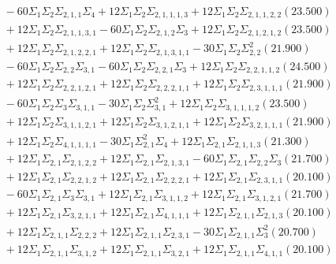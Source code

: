 \documentclass[12pt]{article}
\begin{document}
\begin{landscape}
\begin{align*}
		&\quad\quad -60\Sigma_{1}\Sigma_{2}\Sigma_{2,1,1}\Sigma_{4}+12\Sigma_{1}\Sigma_{2}\Sigma_{2,1,1,1,3}+12\Sigma_{1}\Sigma_{2}\Sigma_{2,1,1,2,2}(23.500) \\ 
		&\quad\quad +12\Sigma_{1}\Sigma_{2}\Sigma_{2,1,1,3,1}-60\Sigma_{1}\Sigma_{2}\Sigma_{2,1,2}\Sigma_{3}+12\Sigma_{1}\Sigma_{2}\Sigma_{2,1,2,1,2}(23.500) \\ 
		&\quad\quad +12\Sigma_{1}\Sigma_{2}\Sigma_{2,1,2,2,1}+12\Sigma_{1}\Sigma_{2}\Sigma_{2,1,3,1,1}-30\Sigma_{1}\Sigma_{2}\Sigma_{2,2}^{2}(21.900) \\ 
		&\quad\quad -60\Sigma_{1}\Sigma_{2}\Sigma_{2,2}\Sigma_{3,1}-60\Sigma_{1}\Sigma_{2}\Sigma_{2,2,1}\Sigma_{3}+12\Sigma_{1}\Sigma_{2}\Sigma_{2,2,1,1,2}(24.500) \\ 
		&\quad\quad +12\Sigma_{1}\Sigma_{2}\Sigma_{2,2,1,2,1}+12\Sigma_{1}\Sigma_{2}\Sigma_{2,2,2,1,1}+12\Sigma_{1}\Sigma_{2}\Sigma_{2,3,1,1,1}(21.900) \\ 
		&\quad\quad -60\Sigma_{1}\Sigma_{2}\Sigma_{3}\Sigma_{3,1,1}-30\Sigma_{1}\Sigma_{2}\Sigma_{3,1}^{2}+12\Sigma_{1}\Sigma_{2}\Sigma_{3,1,1,1,2}(23.500) \\ 
		&\quad\quad +12\Sigma_{1}\Sigma_{2}\Sigma_{3,1,1,2,1}+12\Sigma_{1}\Sigma_{2}\Sigma_{3,1,2,1,1}+12\Sigma_{1}\Sigma_{2}\Sigma_{3,2,1,1,1}(21.900) \\ 
		&\quad\quad +12\Sigma_{1}\Sigma_{2}\Sigma_{4,1,1,1,1}-30\Sigma_{1}\Sigma_{2,1}^{2}\Sigma_{4}+12\Sigma_{1}\Sigma_{2,1}\Sigma_{2,1,1,3}(21.300) \\ 
		&\quad\quad +12\Sigma_{1}\Sigma_{2,1}\Sigma_{2,1,2,2}+12\Sigma_{1}\Sigma_{2,1}\Sigma_{2,1,3,1}-60\Sigma_{1}\Sigma_{2,1}\Sigma_{2,2}\Sigma_{3}(21.700) \\ 
		&\quad\quad +12\Sigma_{1}\Sigma_{2,1}\Sigma_{2,2,1,2}+12\Sigma_{1}\Sigma_{2,1}\Sigma_{2,2,2,1}+12\Sigma_{1}\Sigma_{2,1}\Sigma_{2,3,1,1}(20.100) \\ 
		&\quad\quad -60\Sigma_{1}\Sigma_{2,1}\Sigma_{3}\Sigma_{3,1}+12\Sigma_{1}\Sigma_{2,1}\Sigma_{3,1,1,2}+12\Sigma_{1}\Sigma_{2,1}\Sigma_{3,1,2,1}(21.700) \\ 
		&\quad\quad +12\Sigma_{1}\Sigma_{2,1}\Sigma_{3,2,1,1}+12\Sigma_{1}\Sigma_{2,1}\Sigma_{4,1,1,1}+12\Sigma_{1}\Sigma_{2,1,1}\Sigma_{2,1,3}(20.100) \\ 
		&\quad\quad +12\Sigma_{1}\Sigma_{2,1,1}\Sigma_{2,2,2}+12\Sigma_{1}\Sigma_{2,1,1}\Sigma_{2,3,1}-30\Sigma_{1}\Sigma_{2,1,1}\Sigma_{3}^{2}(20.700) \\ 
		&\quad\quad +12\Sigma_{1}\Sigma_{2,1,1}\Sigma_{3,1,2}+12\Sigma_{1}\Sigma_{2,1,1}\Sigma_{3,2,1}+12\Sigma_{1}\Sigma_{2,1,1}\Sigma_{4,1,1}(20.100) \\ 

\end{align*}
\end{landscape}
\end{document}
